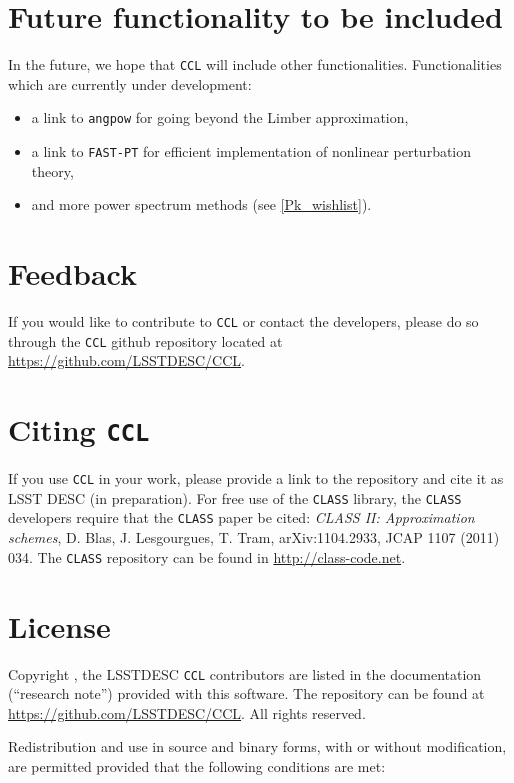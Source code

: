 \documentclass[\docopts]{\docclass}
\newcommand{\ccl}{{\tt CCL}\xspace}
\begin{document}
\section{Future functionality to be included}
\label{sec:future}

In the future, we hope that \ccl will include other functionalities. Functionalities which are currently under development:
\begin{itemize}
        \item a link to {\tt angpow} \citep{2017arXiv170103592C} for going beyond the Limber approximation,
	\item a link to {\tt FAST-PT} \citep{FASTPT} for efficient implementation of nonlinear perturbation theory,
	\item and more power spectrum methods (see \ref{Pk_wishlist}).
\end{itemize}

\section{Feedback}
\label{sec:feedback}

If you would like to contribute to \ccl or contact the developers, please do so through the \ccl github repository located at \url{https://github.com/LSSTDESC/CCL}.

\section{Citing \ccl}
\label{sec:cite}

If you use \ccl in your work, please provide a link to the repository and cite it as LSST DESC (in preparation). For free use of the {\tt CLASS} library, the {\tt CLASS} developers require that the {\tt CLASS} paper be cited: {\it  CLASS II: Approximation schemes}, D. Blas, J. Lesgourgues, T. Tram, arXiv:1104.2933, JCAP 1107 (2011) 034. The {\tt CLASS} repository can be found in \url{http://class-code.net}.

\section{License}
\label{sec:license}

Copyright , the LSSTDESC \ccl contributors are listed in the
documentation (``research note'') provided with this software. The repository can be found at \url{https://github.com/LSSTDESC/CCL}. All rights reserved.

Redistribution and use in source and binary forms, with or without
modification, are permitted provided that the following conditions are met:
\end{document}
